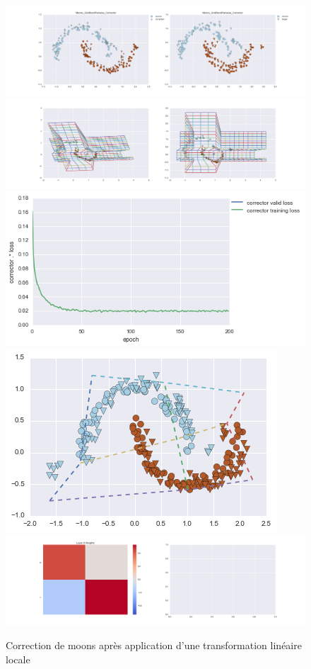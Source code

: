 \begin{figure}[H] %
\centering
\includegraphics[width=\linewidth]{fig/24-05-2016/moons/Moons_GridBendPairwise_Corrector-DATA.png}
\includegraphics[width=\linewidth]{fig/24-05-2016/moons/Moons_GridBendPairwise_Corrector-GridCheck.png}
\includegraphics[width=0.45\linewidth]{fig/24-05-2016/moons/Moons_GridBendPairwise_Corrector-Learning_curve.png}
\includegraphics[width=0.45\linewidth]{fig/24-05-2016/moons/moons_grid.png}
\includegraphics[width=\linewidth]{fig/24-05-2016/moons/Moons_GridBendPairwise_Corrector-W.png}
\caption{Correction de moons après application d'une transformation linéaire locale}
\label{fig:recap-moons-GridBend-pairwise}
\end{figure}

